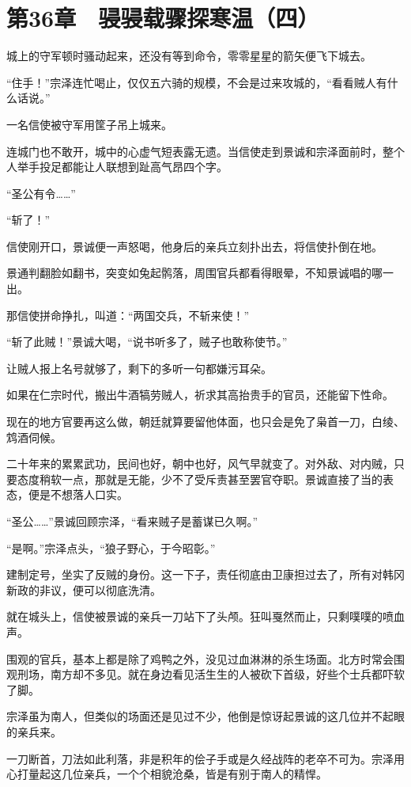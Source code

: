 \section{第36章　骎骎载骤探寒温（四）}

城上的守军顿时骚动起来，还没有等到命令，零零星星的箭矢便飞下城去。

“住手！”宗泽连忙喝止，仅仅五六骑的规模，不会是过来攻城的，“看看贼人有什么话说。”

一名信使被守军用筐子吊上城来。

连城门也不敢开，城中的心虚气短表露无遗。当信使走到景诚和宗泽面前时，整个人举手投足都能让人联想到趾高气昂四个字。

“圣公有令……”

“斩了！”

信使刚开口，景诚便一声怒喝，他身后的亲兵立刻扑出去，将信使扑倒在地。

景通判翻脸如翻书，突变如兔起鹘落，周围官兵都看得眼晕，不知景诚唱的哪一出。

那信使拼命挣扎，叫道：“两国交兵，不斩来使！”

“斩了此贼！”景诚大喝，“说书听多了，贼子也敢称使节。”

让贼人报上名号就够了，剩下的多听一句都嫌污耳朵。

如果在仁宗时代，搬出牛酒犒劳贼人，祈求其高抬贵手的官员，还能留下性命。

现在的地方官要再这么做，朝廷就算要留他体面，也只会是免了枭首一刀，白绫、鸩酒伺候。

二十年来的累累武功，民间也好，朝中也好，风气早就变了。对外敌、对内贼，只要态度稍软一点，那就是无能，少不了受斥责甚至罢官夺职。景诚直接了当的表态，便是不想落人口实。

“圣公……”景诚回顾宗泽，“看来贼子是蓄谋已久啊。”

“是啊。”宗泽点头，“狼子野心，于今昭彰。”

建制定号，坐实了反贼的身份。这一下子，责任彻底由卫康担过去了，所有对韩冈新政的非议，便可以彻底洗清。

就在城头上，信使被景诚的亲兵一刀站下了头颅。狂叫戛然而止，只剩噗噗的喷血声。

围观的官兵，基本上都是除了鸡鸭之外，没见过血淋淋的杀生场面。北方时常会围观刑场，南方却不多见。就在身边看见活生生的人被砍下首级，好些个士兵都吓软了脚。

宗泽虽为南人，但类似的场面还是见过不少，他倒是惊讶起景诚的这几位并不起眼的亲兵来。

一刀断首，刀法如此利落，非是积年的侩子手或是久经战阵的老卒不可为。宗泽用心打量起这几位亲兵，一个个相貌沧桑，皆是有别于南人的精悍。

